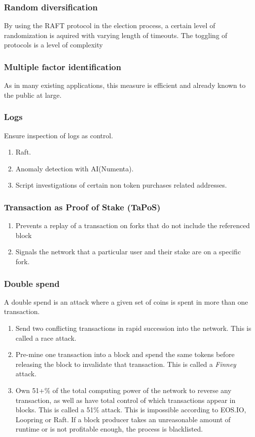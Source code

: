 \documentclass[]{article}
\begin{document}
{		\subsubsection{Random diversification}
		By using the RAFT protocol in the election process, a certain level of randomization is aquired with varying length of timeouts. 
		The toggling of protocols is a level of complexity 
		\subsubsection{Multiple factor identification}
		As in many existing applications, this measure is efficient and already known to the public at large.
		\subsubsection {Logs}
			Ensure inspection of logs as control.
			\begin{enumerate}
				\item Raft.
				\item Anomaly detection with AI(Numenta).
				\item Script investigations of certain non token purchases related addresses.
			\end{enumerate}
		\subsubsection{Transaction as Proof of Stake (TaPoS)}
			\begin{enumerate}
				\item Prevents a replay of a transaction on forks that do not include the referenced block 
				\item Signals the network that a particular user and their stake are on a specific fork.
			\end{enumerate}
		\subsubsection{Double spend}
		A double spend is an attack where a given set of coins is spent in more than one transaction.
		\begin{enumerate}
			\item Send two conflicting transactions in rapid succession into the network. This is called a race attack. 
			\item Pre-mine one transaction into a block and spend the same tokens before releasing the block to invalidate that transaction. 
			This is called a \textit{Finney} attack.
			\item Own 51+\% of the total computing power of the network to reverse any transaction, 
			as well as have total control of which transactions appear in blocks. 
			This is called a 51\% attack.
			This is impossible according to EOS.IO, Loopring or Raft.
			If a block producer takes an unreasonable amount of runtime or is not profitable enough, the process is blacklisted.\cite{7}
		\end{enumerate} 

}
\end{document}
